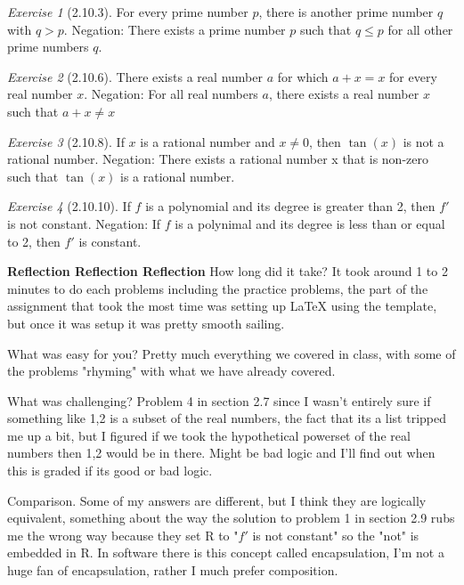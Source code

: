 \documentclass[12pt]{amsart}
\theoremstyle{remark}
\newtheorem*{exercise}{Exercise}%
\theoremstyle{mycomment}
\begin{document}
\begin{exercise}[2.10.3] For every prime number $p$, there is another prime number $q$ with $q > p$. \newline
	Negation: There exists a prime number $p$  such that $q \leq p$ for all other prime numbers $q$.
\end{exercise}
\begin{exercise}[2.10.6] There exists a real number $a$ for which $a + x = x$ for every real number $x$. \newline
	Negation: For all real numbers $a$, there exists a real number $x$ such that $a + x \neq x$
\end{exercise}
\begin{exercise}[2.10.8] If $x$ is a rational number and $x \neq 0$, then $\tan{(x)}$ is not a rational number. \newline
	Negation: There exists a rational number x that is non-zero such that $\tan{(x)}$ is a rational number.
\end{exercise}
\singlespacing
\begin{exercise}[2.10.10] If $f$ is a polynomial and its degree is greater than 2, then $f'$ is not constant. \newline
\newline
Negation: If $f$ is a polynimal and its degree is less than or equal to 2, then $f'$ is constant.
\end{exercise}
\textbf{Reflection Reflection Reflection}\newline
How long did it take?
It took around 1 to 2 minutes to do each problems including the practice problems, the part of the assignment that took the most time was setting up LaTeX using the template, but once it was setup it was pretty smooth sailing. \newline

What was easy for you? Pretty much everything we covered in class, with some of the problems "rhyming" with what we have already covered. \newline

What was challenging? Problem 4 in section 2.7 since I wasn't entirely sure if something like {1,2} is a subset of the real numbers, the fact that its a list tripped me up a bit, but I figured if we took the hypothetical powerset of the real numbers then {1,2} would be in there. Might be bad logic and I'll find out when this is graded if its good or bad logic. \newline

Comparison. Some of my answers are different, but I think they are logically equivalent, something about the way the solution to problem 1 in section 2.9 rubs me the wrong way because they set R to "$f'$ is not constant" so the "not" is embedded in R. In software there is this concept called encapsulation, I'm not a huge fan of encapsulation,  rather I much prefer composition.
\end{document}
